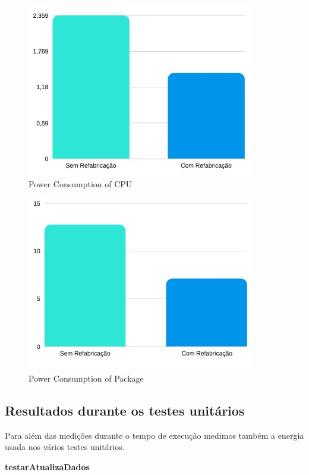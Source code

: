 \begin{figure}[H]
    \centering
    \includegraphics[scale=0.8]{tex/img/graficos/5.jpg}
    \caption{Power Consumption of CPU}
\end{figure}

\begin{figure}[H]
    \centering
    \includegraphics[scale=0.8]{tex/img/graficos/6.jpg}
    \caption{Power Consumption of Package}
\end{figure}

\subsection{Resultados durante os testes unitários}

Para além das medições durante o tempo de execução medimos também a energia usada nos vários testes unitários.
\vspace{5mm}

\textbf{testarAtualizaDados}

